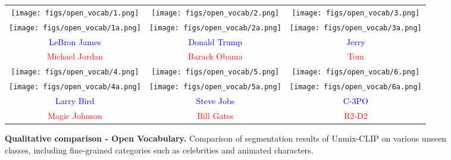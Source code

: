 \begin{figure*}[tp]
    \centering
    \renewcommand{\arraystretch}{1} %
    \setlength{\tabcolsep}{1pt} %
    \begin{tabular}{c c c }
        
        \texttt{[image: figs/open\_vocab/1.png]} & 
        \texttt{[image: figs/open\_vocab/2.png]} & 
        \texttt{[image: figs/open\_vocab/3.png]} \\
        \texttt{[image: figs/open\_vocab/1a.png]} & 
        \texttt{[image: figs/open\_vocab/2a.png]} &
        \texttt{[image: figs/open\_vocab/3a.png]} \\
        \textcolor{blue}{LeBron James} &  \textcolor{blue}{Donald Trump} & \textcolor{blue}{Jerry} \\ 
        \textcolor{red}{Michael Jordan} & \textcolor{red}{Barack Obama}  & \textcolor{red}{Tom} \\ 
        \texttt{[image: figs/open\_vocab/4.png]} &
        \texttt{[image: figs/open\_vocab/5.png]} & 
        \texttt{[image: figs/open\_vocab/6.png]} \\ 
        \texttt{[image: figs/open\_vocab/4a.png]} &
        \texttt{[image: figs/open\_vocab/5a.png]} & 
        \texttt{[image: figs/open\_vocab/6a.png]} \\ 
        \textcolor{blue}{Larry Bird} &  \textcolor{blue}{Steve Jobs} & \textcolor{blue}{C-3PO} \\ 
        \textcolor{red}{Magic Johnson} & \textcolor{red}{Bill Gates}  & \textcolor{red}{R2-D2} \\ 
    \end{tabular}
    \caption{\textbf{Qualitative comparison - Open Vocabulary.} Comparison of segmentation results of Unmix-CLIP on various unseen classes, including fine-grained categories such as celebrities and animated characters.}
    \label{fig:openvocab}
\end{figure*}
